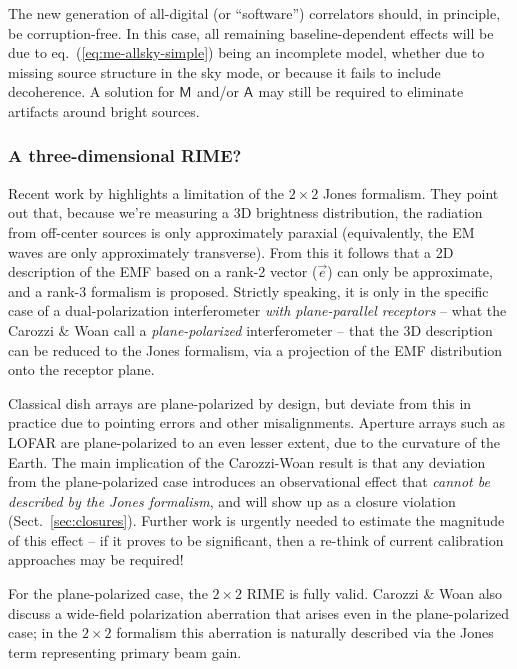 \documentclass[]{aa}
\newcommand{\coh}[2]{\mathsf{{#1}}_{{#2}}}
\begin{document}
The new generation of all-digital (or ``software'') correlators should, in principle, be corruption-free. In this case, all remaining baseline-dependent effects will be due to eq.~(\ref{eq:me-allsky-simple}) being an incomplete model, whether due to missing source structure in the sky mode, or because it fails to include decoherence. A solution for $\coh{M}{}$ and/or $\coh{A}{}$ may still be required to eliminate artifacts around bright sources.

\subsubsection{A three-dimensional RIME?\label{sec:3D-rime}}

Recent work by \citet{Carozzi:ME3D} highlights a limitation of the $2\times2$ Jones formalism. They point out that,  because we're measuring a 3D brightness distribution, the radiation from off-center sources is only approximately paraxial (equivalently, the EM waves are only approximately transverse). From this it follows that a 2D description 
of the EMF based on a rank-2  vector ($\vec e$) can only be approximate, and a rank-3 formalism is proposed. 
Strictly speaking, it is only in the specific case of a dual-polarization interferometer {\em with plane-parallel receptors} -- what the Carozzi \& Woan  call a {\em plane-polarized} interferometer -- that the 3D description can be reduced to the Jones formalism, via a projection of the EMF distribution onto the receptor plane. 

Classical dish arrays are plane-polarized by design, but deviate from this in practice due to pointing errors and other misalignments. Aperture arrays such as LOFAR are plane-polarized to an even lesser extent, due to the curvature of the Earth. The main implication of the Carozzi-Woan result is that any deviation from the plane-polarized case introduces an observational effect that {\em cannot be described by the Jones formalism}, and will show up as a closure violation (Sect.~\ref{sec:closures}). Further work is urgently needed to estimate the magnitude of this effect -- if it proves to be significant, then a re-think of current calibration approaches may be required!

For the plane-polarized case, the $2\times2$ RIME is fully valid. Carozzi \& Woan also discuss a wide-field polarization aberration that arises even in the plane-polarized case; in the $2\times2$ formalism this aberration  is naturally described via the Jones term representing primary beam gain.
\end{document}
